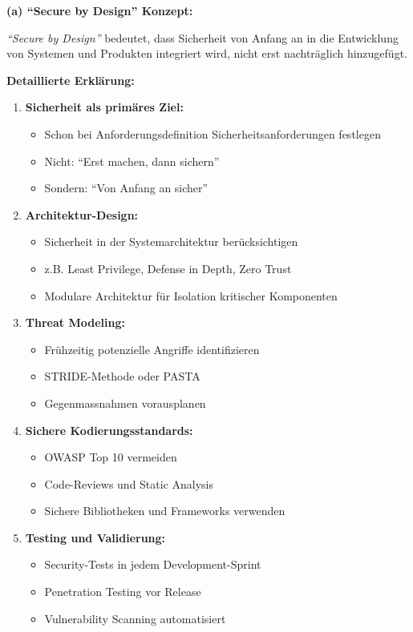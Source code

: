\documentclass[12pt,a4paper]{article}
\begin{document}
\begin{tcolorbox}[colback=solutionbg, colframe=black!30]

\textbf{(a) ``Secure by Design'' Konzept:} \checkmark

\textit{``Secure by Design''} bedeutet, dass Sicherheit von Anfang an in die Entwicklung von Systemen und Produkten integriert wird, nicht erst nachträglich hinzugefügt.

\textbf{Detaillierte Erklärung:}

\begin{enumerate}[1.]
    \item \textbf{Sicherheit als primäres Ziel:}
    \begin{itemize}
        \item Schon bei Anforderungsdefinition Sicherheitsanforderungen festlegen
        \item Nicht: ``Erst machen, dann sichern''
        \item Sondern: ``Von Anfang an sicher''
    \end{itemize}
    
    \item \textbf{Architektur-Design:}
    \begin{itemize}
        \item Sicherheit in der Systemarchitektur berücksichtigen
        \item z.B. Least Privilege, Defense in Depth, Zero Trust
        \item Modulare Architektur für Isolation kritischer Komponenten
    \end{itemize}
    
    \item \textbf{Threat Modeling:}
    \begin{itemize}
        \item Frühzeitig potenzielle Angriffe identifizieren
        \item STRIDE-Methode oder PASTA
        \item Gegenmassnahmen vorausplanen
    \end{itemize}
    
    \item \textbf{Sichere Kodierungsstandards:}
    \begin{itemize}
        \item OWASP Top 10 vermeiden
        \item Code-Reviews und Static Analysis
        \item Sichere Bibliotheken und Frameworks verwenden
    \end{itemize}
    
    \item \textbf{Testing und Validierung:}
    \begin{itemize}
        \item Security-Tests in jedem Development-Sprint
        \item Penetration Testing vor Release
        \item Vulnerability Scanning automatisiert
    \end{itemize}
\end{enumerate}

\end{tcolorbox}
\end{document}
